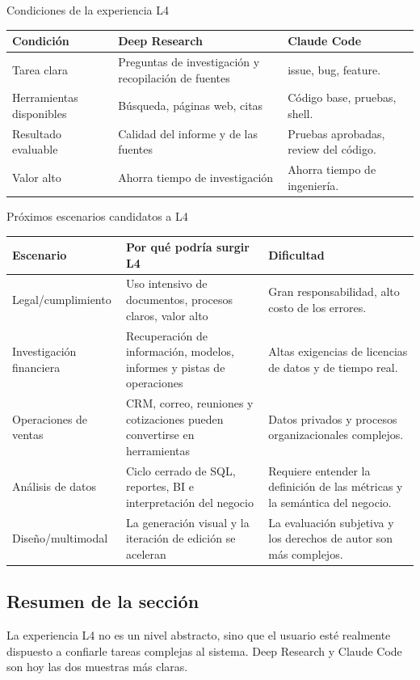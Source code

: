 \begin{knowledgebox}{Condiciones de la experiencia L4}
\begin{tabularx}{\textwidth}{p{}p{}X}
\toprule
Condición & Deep Research & Claude Code \\
\midrule
Tarea clara & Preguntas de investigación y recopilación de fuentes & issue, bug, feature. \\
Herramientas disponibles & Búsqueda, páginas web, citas & Código base, pruebas, shell. \\
Resultado evaluable & Calidad del informe y de las fuentes & Pruebas aprobadas, review del código. \\
Valor alto & Ahorra tiempo de investigación & Ahorra tiempo de ingeniería. \\
\bottomrule
\end{tabularx}
\end{knowledgebox}

\begin{knowledgebox}{Próximos escenarios candidatos a L4}
\begin{tabularx}{\textwidth}{p{}p{}X}
\toprule
Escenario & Por qué podría surgir L4 & Dificultad \\
\midrule
Legal/cumplimiento & Uso intensivo de documentos, procesos claros, valor alto & Gran responsabilidad, alto costo de los errores. \\
Investigación financiera & Recuperación de información, modelos, informes y pistas de operaciones & Altas exigencias de licencias de datos y de tiempo real. \\
Operaciones de ventas & CRM, correo, reuniones y cotizaciones pueden convertirse en herramientas & Datos privados y procesos organizacionales complejos. \\
Análisis de datos & Ciclo cerrado de SQL, reportes, BI e interpretación del negocio & Requiere entender la definición de las métricas y la semántica del negocio. \\
Diseño/multimodal & La generación visual y la iteración de edición se aceleran & La evaluación subjetiva y los derechos de autor son más complejos. \\
\bottomrule
\end{tabularx}
\end{knowledgebox}

\subsection{Resumen de la sección}

La experiencia L4 no es un nivel abstracto, sino que el usuario esté realmente dispuesto a confiarle tareas complejas al sistema. Deep Research y Claude Code son hoy las dos muestras más claras.
